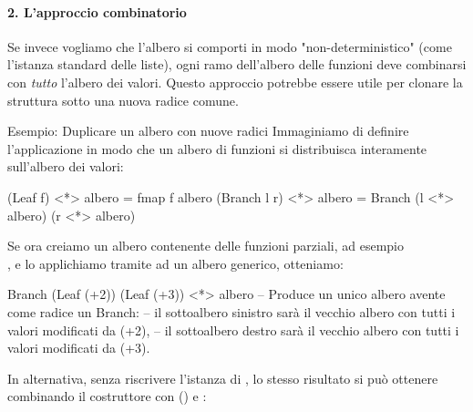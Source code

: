 \paragraph{2. L'approccio combinatorio}
Se invece vogliamo che l'albero si comporti in modo "non-deterministico" (come l'istanza standard delle liste), ogni ramo dell'albero delle funzioni deve combinarsi con \textit{tutto} l'albero dei valori. Questo approccio potrebbe essere utile per clonare la struttura sotto una nuova radice comune.

\begin{gframe}{Esempio: Duplicare un albero con nuove radici}
    Immaginiamo di definire l'applicazione in modo che un albero di funzioni si distribuisca interamente sull'albero dei valori:
    \begin{haskellbox}{}
(Leaf f) <*> albero = fmap f albero
(Branch l r) <*> albero = Branch (l <*> albero) (r <*> albero)
    \end{haskellbox}

    Se ora creiamo un albero contenente delle funzioni parziali, ad esempio \\
    , e lo applichiamo tramite \code{<*>} ad un albero generico, otteniamo:
    
    \begin{haskellbox}{}
Branch (Leaf (+2)) (Leaf (+3)) <*> albero
-- Produce un unico albero avente come radice un Branch:
-- il sottoalbero sinistro sarà il vecchio albero con tutti i valori modificati da (+2),
-- il sottoalbero destro sarà il vecchio albero con tutti i valori modificati da (+3).
    \end{haskellbox}

In alternativa, senza riscrivere l'istanza di , lo stesso risultato si può ottenere combinando il costruttore  con  (\code{<\$>}) e \code{<*>}:
\end{gframe}


